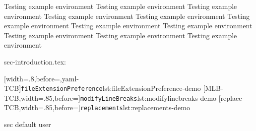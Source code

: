 
\begin{example}
  Testing example environment
  Testing example environment
  Testing example environment
  Testing example environment
  Testing example environment
  Testing example environment
  Testing example environment
  Testing example environment
  Testing example environment
  Testing example environment
  Testing example environment
\end{example}

sec-introduction.tex:

[width=.8\linewidth,before=\centering,yaml-TCB]{\texttt{fileExtensionPreference}}{lst:fileExtensionPreference-demo}
[MLB-TCB,width=.85\linewidth,before=\centering]{\texttt{modifyLineBreaks}}{lst:modifylinebreaks-demo}
[replace-TCB,width=.85\linewidth,before=\centering]{\texttt{replacements}}{lst:replacements-demo}

sec default user


